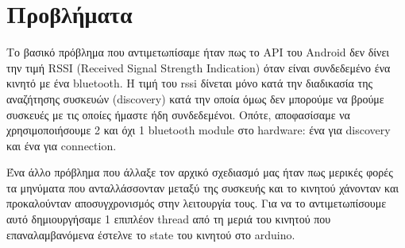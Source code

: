 \section{Προβλήματα}
Το βασικό πρόβλημα που αντιμετωπίσαμε ήταν πως το API του Android δεν δίνει την τιμή RSSI (Received Signal Strength Indication) όταν είναι συνδεδεμένο ένα κινητό με ένα bluetooth.
Η τιμή του rssi δίνεται μόνο κατά την διαδικασία της αναζήτησης συσκευών (discovery) κατά την οποία όμως δεν μπορούμε να βρούμε συσκευές με τις οποίες ήμαστε ήδη συνδεδεμένοι.
Οπότε, αποφασίσαμε να χρησιμοποιήσουμε 2 και όχι 1 bluetooth module στο hardware: ένα για discovery και ένα για connection.

Ένα άλλο πρόβλημα που άλλαξε τον αρχικό σχεδιασμό μας ήταν πως μερικές φορές τα μηνύματα που ανταλλάσσονταν μεταξύ της συσκευής και το κινητού χάνονταν και προκαλούνταν αποσυγχρονισμός στην λειτουργία τους.
Για να το αντιμετωπίσουμε αυτό δημιουργήσαμε 1 επιπλέον thread από τη μεριά του κινητού που επαναλαμβανόμενα έστελνε το state του κινητού στο arduino.
